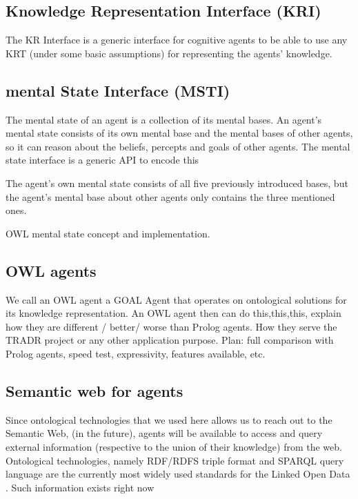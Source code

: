 \subsection{Knowledge Representation Interface (KRI)}

The KR Interface is a generic interface for cognitive agents to be able to use any KRT (under some basic assumptions) for representing the agents' knowledge. 


\subsection{mental State Interface (MSTI)}

The mental state of an agent is a collection of its mental bases. An agent's mental state consists of its own mental base and the mental bases of other agents, so it can reason about the beliefs, percepts and goals of other agents. The mental state interface is a generic API to encode this 

The agent's own mental state consists of all five previously introduced bases, but the agent's mental base about other agents only contains the three mentioned ones. 

OWL mental state concept and implementation.


\subsection{OWL agents}

We call an OWL agent a GOAL Agent that operates on ontological solutions for its knowledge representation. An OWL agent then can do this,this,this, explain how they are different / better/ worse than Prolog agents. How they serve the TRADR project or any other application purpose. 
Plan: full comparison with Prolog agents, speed test, expressivity, features available, etc.

\subsection{Semantic web for agents}

Since ontological technologies that we used here allows us to reach out to the Semantic Web,
(in the future), agents will be available to access and query external information (respective to the union of their knowledge) from the web. Ontological technologies, namely RDF/RDFS triple format \cite{} and SPARQL query language \cite{} are the currently most widely used standards for the Linked Open Data \cite{}. Such information exists right now  



